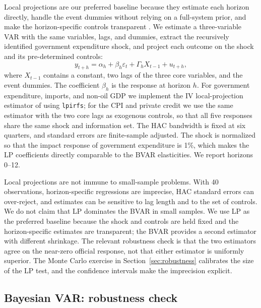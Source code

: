 \documentclass[11pt,a4paper]{article}
\begin{document}
Local projections are our preferred baseline because they estimate each horizon directly, handle the event dummies without relying on a full-system prior, and make the horizon-specific controls transparent \parencite{jorda2005}. We estimate a three-variable VAR with the same variables, lags, and dummies, extract the recursively identified government expenditure shock, and project each outcome on the shock and its pre-determined controls:
\[
y_{t+h} = \alpha_h + \beta_h \varepsilon_t + \Gamma_h X_{t-1} + u_{t+h},
\]
where $X_{t-1}$ contains a constant, two lags of the three core variables, and the event dummies. The coefficient $\beta_h$ is the response at horizon $h$. For government expenditure, imports, and non-oil GDP we implement the IV local-projection estimator of \textcite{adammer2019} using \texttt{lpirfs}; for the CPI and private credit we use the same estimator with the two core lags as exogenous controls, so that all five responses share the same shock and information set. The HAC bandwidth is fixed at six quarters, and standard errors are finite-sample adjusted. The shock is normalized so that the impact response of government expenditure is 1\%, which makes the LP coefficients directly comparable to the BVAR elasticities. We report horizons 0--12.

Local projections are not immune to small-sample problems. With 40 observations, horizon-specific regressions are imprecise, HAC standard errors can over-reject, and estimates can be sensitive to lag length and to the set of controls. We do not claim that LP dominates the BVAR in small samples. We use LP as the preferred baseline because the shock and controls are held fixed and the horizon-specific estimates are transparent; the BVAR provides a second estimator with different shrinkage. The relevant robustness check is that the two estimators agree on the near-zero official response, not that either estimator is uniformly superior. The Monte Carlo exercise in Section~\ref{sec:robustness} calibrates the size of the LP test, and the confidence intervals make the imprecision explicit.

\subsection{Bayesian VAR: robustness check}
\label{sec:bvar}
\end{document}
